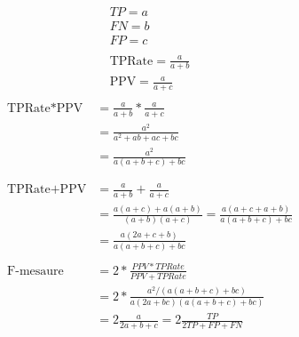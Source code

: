 \[
\begin{array}{l}
    TP = a \\
    FN = b \\
    FP = c \\
    \\
    \text{TPRate} = \frac{a}{a + b}\\
    \text{PPV} = \frac{a}{a + c} \\
\end{array}    
\]
\begin{equation*}
    \begin{split}
        \text{TPRate}\ast\text{PPV} &= \frac{a}{a + b}\ast \frac{a}{a + c} \\
        &= \frac{a^2}{a^2 + ab + ac + bc} \\
        &= \frac{a^2}{a(a+b+c)+bc} \\
        \\
        \\
        \text{TPRate} + \text{PPV} &= \frac{a}{a + b} + \frac{a}{a + c} \\
        &= \frac{a(a+c) + a(a+b)}{(a+b)(a+c)} = \frac{a(a + c + a +b)}{a(a+b+c)+bc} \\
        &= \frac{a(2a + c + b)}{a(a+b+c)+bc} 
        \\
        \\
        \text{F-mesaure} &= 2\ast\frac{PPV\ast TPRate}{PPV + TPRate} \\
        &= 2 \ast \frac{a^2 / (a(a+b+c)+bc)}{a(2a+b
        c)(a(a+b+c)+bc)} \\
        &= 2\frac{a}{2a + b +c } = 2\frac{TP}{2TP + FP + FN}
    \end{split}
\end{equation*}

